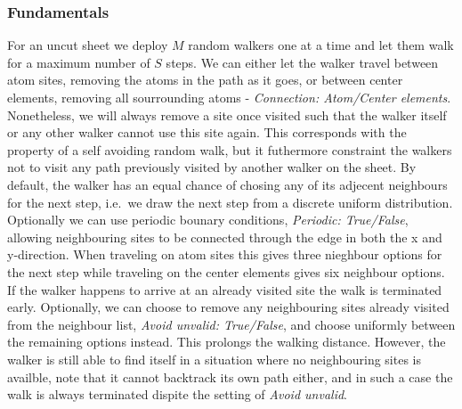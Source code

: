 \subsubsection{Fundamentals} %
For an uncut sheet we deploy $M$ random walkers one at a time and let them walk
for a maximum number of $S$ steps. We can either let the walker travel between
atom sites, removing the atoms in the path as it goes, or between center
elements, removing all sourrounding atoms - \textit{Connection: Atom/Center
elements}. Nonetheless, we will always remove a site once visited such that the
walker itself or any other walker cannot use this site again. This corresponds
with the property of a self avoiding random walk, but it futhermore constraint
the walkers not to visit any path previously visited by another walker on the
sheet. By default, the walker has an equal chance of chosing any of its adjecent
neighbours for the next step, i.e.\ we draw the next step from a discrete
uniform distribution. Optionally we can use periodic bounary conditions,
\textit{Periodic: True/False}, allowing neighbouring sites to be connected
through the edge in both the x and y-direction. When traveling on atom sites
this gives three nieghbour options for the next step while traveling on the
center elements gives six neighbour options. If the walker happens to arrive at
an already visited site the walk is terminated early. Optionally, we can choose
to remove any neighbouring sites already visited from the neighbour list,
\textit{Avoid unvalid: True/False}, and choose uniformly between the remaining
options instead. This prolongs the walking distance. However, the walker is
still able to find itself in a situation where no neighbouring sites is
availble, note that it cannot backtrack its own path either, and in such a case
the walk is always terminated dispite the setting of \textit{Avoid unvalid}.


